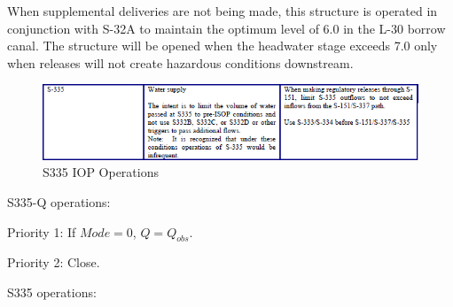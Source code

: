 When supplemental deliveries are not being made, this structure is operated in conjunction with S-32A to maintain the optimum level of 6.0 in the L-30 borrow canal.
The structure will be opened when the headwater stage exceeds 7.0 only when releases will not create hazardous conditions downstream.


\begin{figure}[!h]
  \begin{center}
  \includegraphics[width=6.5in]{../figs/S335_IOPops.png}
  \caption{S335 IOP Operations}
  \label{fig:S335iop}
  \end{center}
\end{figure}
%
%


S335-Q operations:
\begin{packed_items}
\item Priority 1: If $Mode=0$, $Q = Q_{obs}$.
\item Priority 2: Close.
\end{packed_items}

S335 operations:

